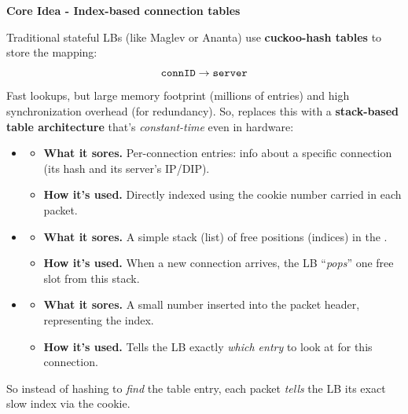 \highspace
\begin{flushleft}
    \textcolor{Green3}{ \textbf{Core Idea - Index-based connection tables}}
\end{flushleft}
Traditional stateful LBs (like Maglev or Ananta) use \textbf{cuckoo-hash tables} to store the mapping:
\begin{equation*}
    \texttt{connID} \to \texttt{server}
\end{equation*}
Fast lookups, but large memory footprint (millions of entries) and high synchronization overhead (for redundancy). So,  replaces this with a \textbf{stack-based table architecture} that's \emph{constant-time} even in hardware:
\begin{itemize}
    \item {}
    \begin{itemize}
        \item[\textcolor{Green3}{\faIcon{question-circle}}] \textcolor{Green3}{\textbf{What it sores.}} Per-connection entries: info about a specific connection (its hash and its server's IP/DIP).
        \item[\textcolor{Green3}{\faIcon{question-circle}}] \textcolor{Green3}{\textbf{How it's used.}} Directly indexed using the cookie number carried in each packet.
    \end{itemize}
    \item {}
    \begin{itemize}
        \item[\textcolor{Green3}{\faIcon{question-circle}}] \textcolor{Green3}{\textbf{What it sores.}} A simple stack (list) of free positions (indices) in the .
        \item[\textcolor{Green3}{\faIcon{question-circle}}] \textcolor{Green3}{\textbf{How it's used.}} When a new connection arrives, the LB ``\emph{pops}'' one free slot from this stack.
    \end{itemize}
    \item {}
    \begin{itemize}
        \item[\textcolor{Green3}{\faIcon{question-circle}}] \textcolor{Green3}{\textbf{What it sores.}} A small number inserted into the packet header, representing the  index.
        \item[\textcolor{Green3}{\faIcon{question-circle}}] \textcolor{Green3}{\textbf{How it's used.}} Tells the LB exactly \emph{which  entry} to look at for this connection.
    \end{itemize}
\end{itemize}
So instead of hashing to \emph{find} the table entry, each packet \emph{tells} the LB its exact slow index via the cookie.

